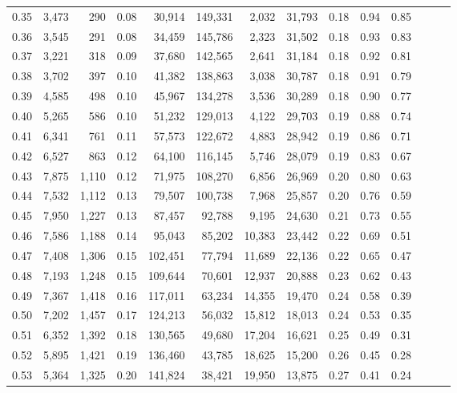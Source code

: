 \begin{tabular}{rrrrrrrrrrrrrr}
0.35 &  3,473 &    290 &  0.08 &   30,914 &  149,331 &   2,032 &  31,793 &  0.18 &  0.94 &      0.85 \\
0.36 &  3,545 &    291 &  0.08 &   34,459 &  145,786 &   2,323 &  31,502 &  0.18 &  0.93 &      0.83 \\
0.37 &  3,221 &    318 &  0.09 &   37,680 &  142,565 &   2,641 &  31,184 &  0.18 &  0.92 &      0.81 \\
0.38 &  3,702 &    397 &  0.10 &   41,382 &  138,863 &   3,038 &  30,787 &  0.18 &  0.91 &      0.79 \\
0.39 &  4,585 &    498 &  0.10 &   45,967 &  134,278 &   3,536 &  30,289 &  0.18 &  0.90 &      0.77 \\
0.40 &  5,265 &    586 &  0.10 &   51,232 &  129,013 &   4,122 &  29,703 &  0.19 &  0.88 &      0.74 \\
0.41 &  6,341 &    761 &  0.11 &   57,573 &  122,672 &   4,883 &  28,942 &  0.19 &  0.86 &      0.71 \\
0.42 &  6,527 &    863 &  0.12 &   64,100 &  116,145 &   5,746 &  28,079 &  0.19 &  0.83 &      0.67 \\
0.43 &  7,875 &  1,110 &  0.12 &   71,975 &  108,270 &   6,856 &  26,969 &  0.20 &  0.80 &      0.63 \\
0.44 &  7,532 &  1,112 &  0.13 &   79,507 &  100,738 &   7,968 &  25,857 &  0.20 &  0.76 &      0.59 \\
0.45 &  7,950 &  1,227 &  0.13 &   87,457 &   92,788 &   9,195 &  24,630 &  0.21 &  0.73 &      0.55 \\
0.46 &  7,586 &  1,188 &  0.14 &   95,043 &   85,202 &  10,383 &  23,442 &  0.22 &  0.69 &      0.51 \\
0.47 &  7,408 &  1,306 &  0.15 &  102,451 &   77,794 &  11,689 &  22,136 &  0.22 &  0.65 &      0.47 \\
0.48 &  7,193 &  1,248 &  0.15 &  109,644 &   70,601 &  12,937 &  20,888 &  0.23 &  0.62 &      0.43 \\
0.49 &  7,367 &  1,418 &  0.16 &  117,011 &   63,234 &  14,355 &  19,470 &  0.24 &  0.58 &      0.39 \\
0.50 &  7,202 &  1,457 &  0.17 &  124,213 &   56,032 &  15,812 &  18,013 &  0.24 &  0.53 &      0.35 \\
0.51 &  6,352 &  1,392 &  0.18 &  130,565 &   49,680 &  17,204 &  16,621 &  0.25 &  0.49 &      0.31 \\
0.52 &  5,895 &  1,421 &  0.19 &  136,460 &   43,785 &  18,625 &  15,200 &  0.26 &  0.45 &      0.28 \\
0.53 &  5,364 &  1,325 &  0.20 &  141,824 &   38,421 &  19,950 &  13,875 &  0.27 &  0.41 &      0.24 \\

\end{tabular}
